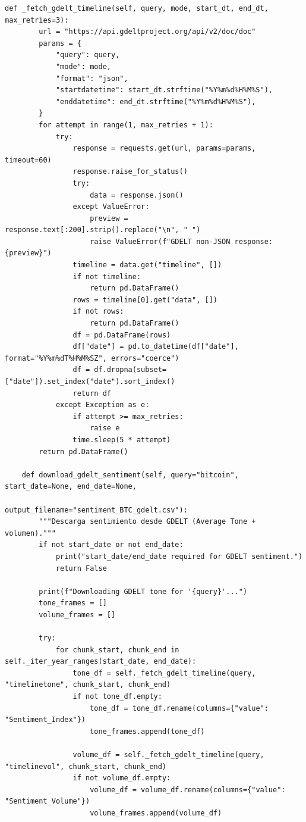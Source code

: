 \begin{lstlisting}[frame=single, caption={Descargador de datos financieros}]
    def _fetch_gdelt_timeline(self, query, mode, start_dt, end_dt, max_retries=3):
        url = "https://api.gdeltproject.org/api/v2/doc/doc"
        params = {
            "query": query,
            "mode": mode,
            "format": "json",
            "startdatetime": start_dt.strftime("%Y%m%d%H%M%S"),
            "enddatetime": end_dt.strftime("%Y%m%d%H%M%S"),
        }
        for attempt in range(1, max_retries + 1):
            try:
                response = requests.get(url, params=params, timeout=60)
                response.raise_for_status()
                try:
                    data = response.json()
                except ValueError:
                    preview = response.text[:200].strip().replace("\n", " ")
                    raise ValueError(f"GDELT non-JSON response: {preview}")
                timeline = data.get("timeline", [])
                if not timeline:
                    return pd.DataFrame()
                rows = timeline[0].get("data", [])
                if not rows:
                    return pd.DataFrame()
                df = pd.DataFrame(rows)
                df["date"] = pd.to_datetime(df["date"], format="%Y%m%dT%H%M%SZ", errors="coerce")
                df = df.dropna(subset=["date"]).set_index("date").sort_index()
                return df
            except Exception as e:
                if attempt >= max_retries:
                    raise e
                time.sleep(5 * attempt)
        return pd.DataFrame()

    def download_gdelt_sentiment(self, query="bitcoin", start_date=None, end_date=None,
                                 output_filename="sentiment_BTC_gdelt.csv"):
        """Descarga sentimiento desde GDELT (Average Tone + volumen)."""
        if not start_date or not end_date:
            print("start_date/end_date required for GDELT sentiment.")
            return False

        print(f"Downloading GDELT tone for '{query}'...")
        tone_frames = []
        volume_frames = []

        try:
            for chunk_start, chunk_end in self._iter_year_ranges(start_date, end_date):
                tone_df = self._fetch_gdelt_timeline(query, "timelinetone", chunk_start, chunk_end)
                if not tone_df.empty:
                    tone_df = tone_df.rename(columns={"value": "Sentiment_Index"})
                    tone_frames.append(tone_df)

                volume_df = self._fetch_gdelt_timeline(query, "timelinevol", chunk_start, chunk_end)
                if not volume_df.empty:
                    volume_df = volume_df.rename(columns={"value": "Sentiment_Volume"})
                    volume_frames.append(volume_df)


\end{lstlisting}
